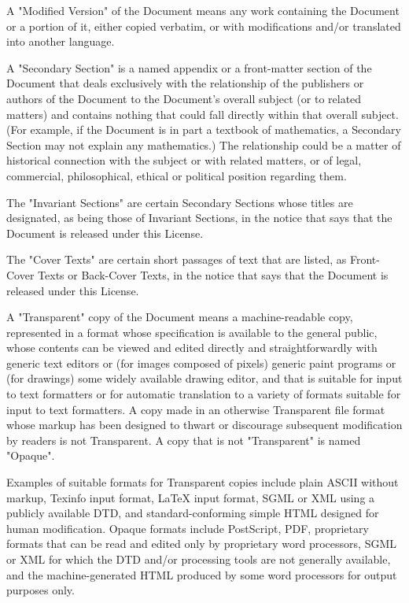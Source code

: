 	A "Modified Version" of the Document means any work containing the Document or a portion of it, either copied verbatim, or with modifications and/or translated into another language. 

	A "Secondary Section" is a named appendix or a front-matter section of the Document that deals exclusively with the relationship of the publishers or authors of the Document to the Document's overall subject (or to related matters) and contains nothing that could fall directly within that overall subject. (For example, if the Document is in part a textbook of mathematics, a Secondary Section may not explain any mathematics.) The relationship could be a matter of historical connection with the subject or with related matters, or of legal, commercial, philosophical, ethical or political position regarding them. 

	The "Invariant Sections" are certain Secondary Sections whose titles are designated, as being those of Invariant Sections, in the notice that says that the Document is released under this License. 

	The "Cover Texts" are certain short passages of text that are listed, as Front-Cover Texts or Back-Cover Texts, in the notice that says that the Document is released under this License. 

	A "Transparent" copy of the Document means a machine-readable copy, represented in a format whose specification is available to the general public, whose contents can be viewed and edited directly and straightforwardly with generic text editors or (for images composed of pixels) generic paint programs or (for drawings) some widely available drawing editor, and that is suitable for input to text formatters or for automatic translation to a variety of formats suitable for input to text formatters. A copy made in an otherwise Transparent file format whose markup has been designed to thwart or discourage subsequent modification by readers is not Transparent. A copy that is not "Transparent" is named "Opaque". 

	Examples of suitable formats for Transparent copies include plain ASCII without markup, Texinfo input format, LaTeX input format, SGML or XML using a publicly available DTD, and standard-conforming simple HTML designed for human modification. Opaque formats include PostScript, PDF, proprietary formats that can be read and edited only by proprietary word processors, SGML or XML for which the DTD and/or processing tools are not generally available, and the machine-generated HTML produced by some word processors for output purposes only. 

